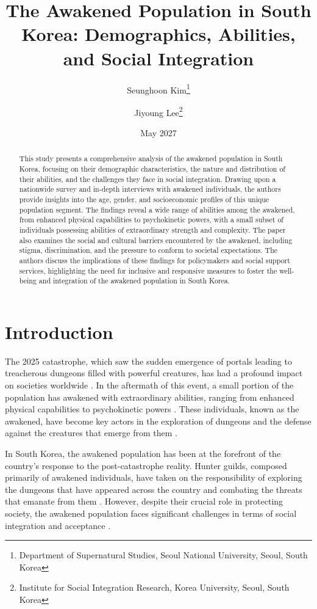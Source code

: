 \documentclass[12pt, a4paper]{article}
\title{The Awakened Population in South Korea: Demographics, Abilities, and Social Integration}
\author{Seunghoon Kim\footnote{Department of Supernatural Studies, Seoul National University, Seoul, South Korea} \and Jiyoung Lee\footnote{Institute for Social Integration Research, Korea University, Seoul, South Korea}}
\date{May 2027}
\begin{document}
\maketitle

\begin{abstract}
This study presents a comprehensive analysis of the awakened population in South Korea, focusing on their demographic characteristics, the nature and distribution of their abilities, and the challenges they face in social integration. Drawing upon a nationwide survey and in-depth interviews with awakened individuals, the authors provide insights into the age, gender, and socioeconomic profiles of this unique population segment. The findings reveal a wide range of abilities among the awakened, from enhanced physical capabilities to psychokinetic powers, with a small subset of individuals possessing abilities of extraordinary strength and complexity. The paper also examines the social and cultural barriers encountered by the awakened, including stigma, discrimination, and the pressure to conform to societal expectations. The authors discuss the implications of these findings for policymakers and social support services, highlighting the need for inclusive and responsive measures to foster the well-being and integration of the awakened population in South Korea.
\end{abstract}

\section{Introduction}
The 2025 catastrophe, which saw the sudden emergence of portals leading to treacherous dungeons filled with powerful creatures, has had a profound impact on societies worldwide \citep{nakamura2027rise}. In the aftermath of this event, a small portion of the population has awakened with extraordinary abilities, ranging from enhanced physical capabilities to psychokinetic powers \citep{lee2027psychological}. These individuals, known as the awakened, have become key actors in the exploration of dungeons and the defense against the creatures that emerge from them \citep{kim2027emergence}.

In South Korea, the awakened population has been at the forefront of the country's response to the post-catastrophe reality. Hunter guilds, composed primarily of awakened individuals, have taken on the responsibility of exploring the dungeons that have appeared across the country and combating the threats that emanate from them \citep{seo2027shamanism}. However, despite their crucial role in protecting society, the awakened population faces significant challenges in terms of social integration and acceptance \citep{lee2027psychological}.
\end{document}

